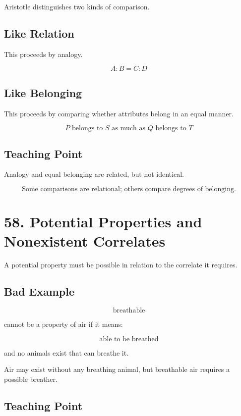 \documentclass[12pt]{article}
\begin{document}
Aristotle distinguishes two kinds of comparison.

\subsection*{Like Relation}

This proceeds by analogy.

\[
A:B = C:D
\]

\subsection*{Like Belonging}

This proceeds by comparing whether attributes belong in an equal manner.

\[
P \text{ belongs to } S \text{ as much as } Q \text{ belongs to } T
\]

\subsection*{Teaching Point}

Analogy and equal belonging are related, but not identical.

\[
\boxed{
\text{Some comparisons are relational; others compare degrees of belonging.}
}
\]

\section*{58. Potential Properties and Nonexistent Correlates}

A potential property must be possible in relation to the correlate it requires.

\subsection*{Bad Example}

\[
\text{breathable}
\]

cannot be a property of air if it means:

\[
\text{able to be breathed}
\]

and no animals exist that can breathe it.

Air may exist without any breathing animal, but breathable air requires a
possible breather.

\subsection*{Teaching Point}
\end{document}
